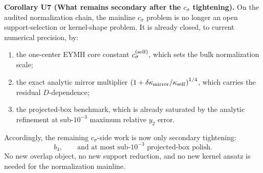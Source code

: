 \documentclass[aps,prd,onecolumn,notitlepage,nofootinbib,superscriptaddress,11pt,floatfix]{revtex4-2}
\begin{document}
\medskip\noindent\textbf{Corollary U7 (What remains secondary after the \texorpdfstring{$c_\sigma$}{c_sigma} tightening).}
On the audited normalization chain, the mainline \(c_\sigma\) problem is no longer an open support-selection or kernel-shape problem.  It is already closed, to current numerical precision, by:
\begin{enumerate}
\item the one-center EYMH core constant \(c_\sigma^{\rm(self)}\), which sets the bulk normalization scale;
\item the exact analytic mirror multiplier \(\left(1+\delta\kappa_{\rm mirror}/\kappa_{\rm self}\right)^{1/4}\), which carries the residual \(D\)-dependence;
\item the projected-box benchmark, which is already saturated by the analytic refinement at sub-\(10^{-3}\) maximum relative \(y_2\) error.
\end{enumerate}
Accordingly, the remaining \(c_\sigma\)-side work is now only secondary tightening:
\[
b_4,
\qquad
\text{and at most sub-}10^{-3}\text{ projected-box polish.}
\]
No new overlap object, no new support reduction, and no new kernel ansatz is needed for the normalization mainline.
\end{document}
